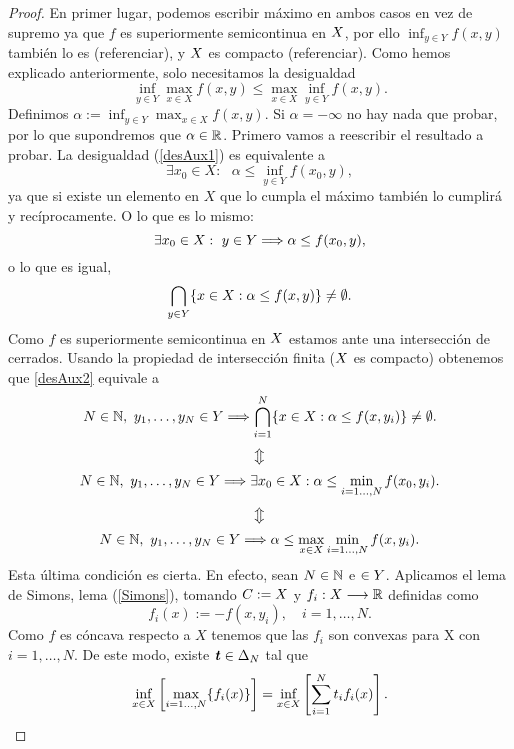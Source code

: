 \begin{proof}
En primer lugar, podemos escribir máximo en ambos casos en vez de supremo ya que $ f $ es superiormente semicontinua en $ X $, por ello $ \inf_{y \in Y} f(x,y) $ también lo es (referenciar), y $ X $ es compacto (referenciar). Como hemos explicado anteriormente, solo necesitamos la desigualdad 
\begin{equation}\label{desAux1}
\inf_{y \in Y} \max_{x \in X} f(x,y) \leq \max_{x \in X} \inf_{y \in Y} f(x,y).
\end{equation}  Definimos $ \alpha := \inf_{y \in Y} \max_{x \in X} f(x,y) $. Si $ \alpha = -\infty $ no hay nada que probar, por lo que supondremos que $ \alpha \in \mathbb{R} $. Primero vamos a reescribir el resultado a probar. La desigualdad (\ref{desAux1}) es equivalente a
\[
\exists x_0 \in X:\text{ }\alpha \leq \inf_{y \in Y} f(x_0,y),
\]
ya que si existe un elemento en $ X $ que lo cumpla el máximo también lo cumplirá y recíprocamente. O lo que es lo mismo:
\[
\exists x_0 \in X:\text{ }y \in Y \Longrightarrow \alpha \leq f(x_0,y),
\]
o lo que es igual, 
\begin{equation}\label{desAux2}
\bigcap_{y\in Y}\{x \in X: \alpha \leq f(x, y) \} \neq \emptyset.
\end{equation}
Como $ f $ es superiormente semicontinua en $ X $ estamos ante una intersección de cerrados. Usando la propiedad de intersección finita ($ X $ es compacto) obtenemos que \ref{desAux2} equivale a
\[
N\in\mathbb{N}, \text{ }y_1,\dots,y_N \in Y \Longrightarrow \bigcap_{i=1}^{N}\{x \in X: \alpha \leq f(x, y_i) \} \neq \emptyset.
\]
\[
\big\Updownarrow
\]
\[
N\in\mathbb{N}, \text{ }y_1,\dots,y_N \in Y \Longrightarrow \exists x_0\in X:\alpha \leq \min_{i=1\dots,N }f(x_0,y_i).
\]
\[
\big\Updownarrow
\]
\begin{equation}\label{desAux}
N\in\mathbb{N}, \text{ }y_1,\dots,y_N \in Y \Longrightarrow \alpha \leq \max_{x \in X} \min_{i=1\dots,N }f(x,y_i).
\end{equation}
Esta última condición es cierta. En efecto, sean $ N \in \mathbb{N} $ e $ \in Y$. Aplicamos el lema de Simons, lema (\ref{Simons}), tomando $ C := X $ y $ f_i: X \longrightarrow \mathbb{R} $ definidas como \[
 f_i(x):=-f(x,y_i), \quad i=1,\dots,N.\]
Como $ f $ es cóncava respecto a $ X $ tenemos que las $ f_i $ son convexas para X con $  i=1,\dots,N $. De este modo, existe $ \textbf{\emph{t}} \in \Delta_N$ tal que
\[
\inf_{x \in X}\left[ \max_{i=1\dots,N } \{f_i(x)\}\right] = \inf_{x \in X} \left[ \sum_{i=1}^{N} t_i f_i(x) \right].
\]
\end{proof}
